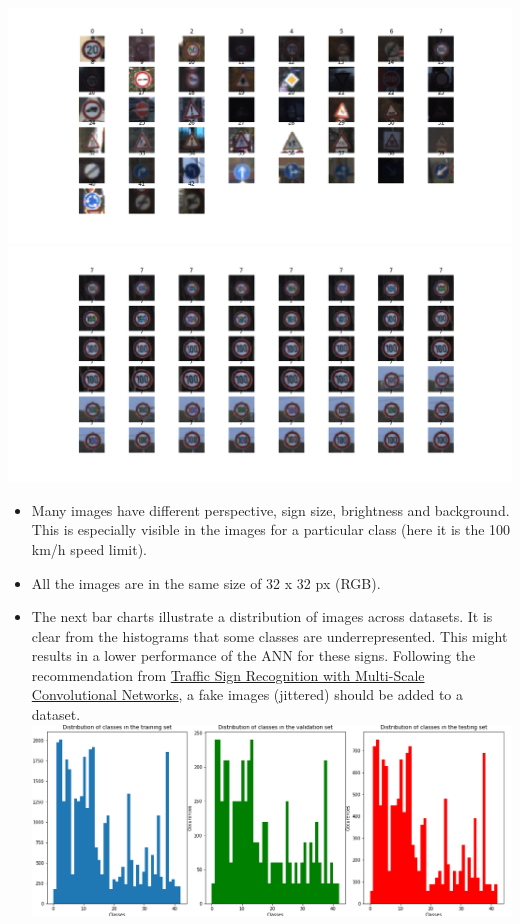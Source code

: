 \documentclass[11pt]{article}
\makeatletter
\def\maxwidth{\ifdim\Gin@nat@width>\linewidth\linewidth
    \else\Gin@nat@width\fi}
\let\Oldincludegraphics\includegraphics
\renewcommand{\includegraphics}[1]{\Oldincludegraphics[width=.8\maxwidth]{#1}}
\makeatother
\begin{document}
\includegraphics{./images/classes_vis.png}
\includegraphics{./images/class_vis.png}

\begin{itemize}
\item
  Many images have different perspective, sign size, brightness and
  background. This is especially visible in the images for a particular
  class (here it is the 100 km/h speed limit).
\item
  All the images are in the same size of 32 x 32 px (RGB).
\item
  The next bar charts illustrate a distribution of images across
  datasets. It is clear from the histograms that some classes are
  underrepresented. This might results in a lower performance of the ANN
  for these signs. Following the recommendation from
  \href{http://yann.lecun.com/exdb/publis/pdf/sermanet-ijcnn-11.pdf}{Traffic
  Sign Recognition with Multi-Scale Convolutional Networks}, a fake
  images (jittered) should be added to a dataset.
  \includegraphics{./images/dataset_dist.png}
\end{itemize}
\end{document}
